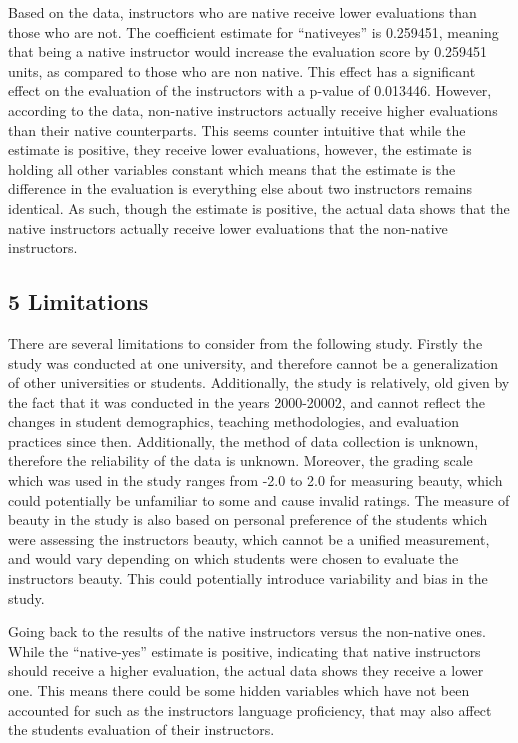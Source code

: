 \documentclass[
  letterpaper,
  DIV=11,
  numbers=noendperiod]{scrartcl}
\begin{document}
Based on the data, instructors who are native receive lower evaluations
than those who are not. The coefficient estimate for ``nativeyes'' is
0.259451, meaning that being a native instructor would increase the
evaluation score by 0.259451 units, as compared to those who are non
native. This effect has a significant effect on the evaluation of the
instructors with a p-value of 0.013446. However, according to the data,
non-native instructors actually receive higher evaluations than their
native counterparts. This seems counter intuitive that while the
estimate is positive, they receive lower evaluations, however, the
estimate is holding all other variables constant which means that the
estimate is the difference in the evaluation is everything else about
two instructors remains identical. As such, though the estimate is
positive, the actual data shows that the native instructors actually
receive lower evaluations that the non-native instructors.

\hypertarget{limitations}{%
\subsection{5 Limitations}\label{limitations}}

There are several limitations to consider from the following study.
Firstly the study was conducted at one university, and therefore cannot
be a generalization of other universities or students. Additionally, the
study is relatively, old given by the fact that it was conducted in the
years 2000-20002, and cannot reflect the changes in student
demographics, teaching methodologies, and evaluation practices since
then. Additionally, the method of data collection is unknown, therefore
the reliability of the data is unknown. Moreover, the grading scale
which was used in the study ranges from -2.0 to 2.0 for measuring
beauty, which could potentially be unfamiliar to some and cause invalid
ratings. The measure of beauty in the study is also based on personal
preference of the students which were assessing the instructors beauty,
which cannot be a unified measurement, and would vary depending on which
students were chosen to evaluate the instructors beauty. This could
potentially introduce variability and bias in the study.

Going back to the results of the native instructors versus the
non-native ones. While the ``native-yes'' estimate is positive,
indicating that native instructors should receive a higher evaluation,
the actual data shows they receive a lower one. This means there could
be some hidden variables which have not been accounted for such as the
instructors language proficiency, that may also affect the students
evaluation of their instructors.
\end{document}
